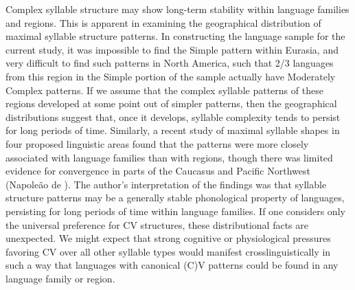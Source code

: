  Complex syllable structure may show long-term stability within language families and regions. This is apparent in examining the geographical distribution of maximal syllable structure patterns. In constructing the language sample for the current study, it was impossible to find the Simple pattern within Eurasia, and very difficult to find such patterns in North America, such that 2/3 languages from this region in the Simple portion of the sample actually have Moderately Complex patterns. If we assume that the complex syllable patterns of these regions developed at some point out of simpler patterns, then the geographical distributions suggest that, once it develops, syllable complexity tends to persist for long periods of time. Similarly, a recent study of maximal syllable shapes in four proposed linguistic areas found that the patterns were more closely associated with language families than with regions, though there was limited evidence for convergence in parts of the Caucasus and Pacific Northwest (Napoleão de \citealt{Souza2017}). The author’s interpretation of the findings was that syllable structure patterns may be a generally stable phonological property of languages, persisting for long periods of time within language families. If one considers only the universal preference for CV structures, these distributional facts are unexpected. We might expect that strong cognitive or physiological pressures favoring CV over all other syllable types would manifest crosslinguistically in such a way that languages with canonical (C)V patterns could be found in any language family or region.



